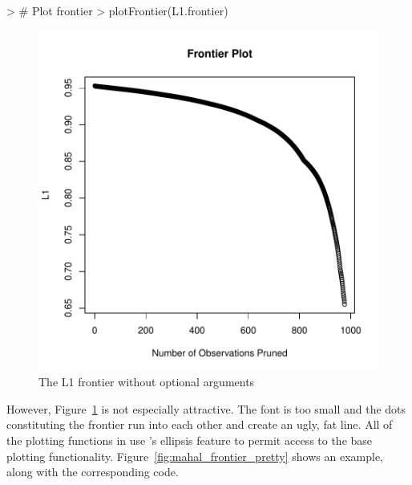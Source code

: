 \documentclass[nojss]{jss}
\begin{document}
\begin{minipage}{0.45\textwidth}
\begin{Schunk}
\begin{Sinput}
> # Plot frontier
> plotFrontier(L1.frontier)
\end{Sinput}
\end{Schunk}
\end{minipage}
\begin{minipage}{0.5\textwidth}
\begin{figure}[H]
\includegraphics{Using_MatchingFrontier-mahal_frontier_plain.pdf}
\caption{\label{fig:mahal_frontier_plain} The L1 frontier without optional arguments}
\end{figure}
\end{minipage} \hfill

However, Figure~\ref{fig:mahal_frontier_plain} is not especially
attractive.  The font is too small and the dots constituting the
frontier run into each other and create an ugly, fat line. All of the
plotting functions in  use 's
ellipsis feature to permit access to the base plotting
functionality. Figure~\ref{fig:mahal_frontier_pretty} shows an
example, along with the corresponding code.
\end{document}
